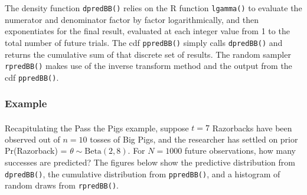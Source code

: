 \documentclass[12pt, a4paper]{article}
\begin{document}
The density function \texttt{dpredBB()} relies on the R function \texttt{lgamma()} to evaluate the numerator and denominator factor by factor logarithmically, and then exponentiates for the final result, evaluated at each integer value from 1 to the total number of future trials.  The cdf \texttt{ppredBB()} simply calls \texttt{dpredBB()} and returns the cumulative sum of that discrete set of results.  The random sampler \texttt{rpredBB()} makes use of the inverse transform method and the output from the cdf \texttt{ppredBB()}.\\




    \subsubsection{Example}

Recapitulating the Pass the Pigs\textsuperscript{\circledR} example, suppose $t=7$ Razorbacks have been observed out of $n=10$ tosses of Big Pigs\texttrademark, and the researcher has settled on prior Pr(Razorback) = $\theta\sim\text{Beta}(2,8)$.  For $N = 1000$ future observations, how many successes are predicted?  The figures below show the predictive distribution from \texttt{dpredBB()}, the cumulative distribution from \texttt{ppredBB()}, and a histogram of random draws from \texttt{rpredBB()}.
\end{document}
